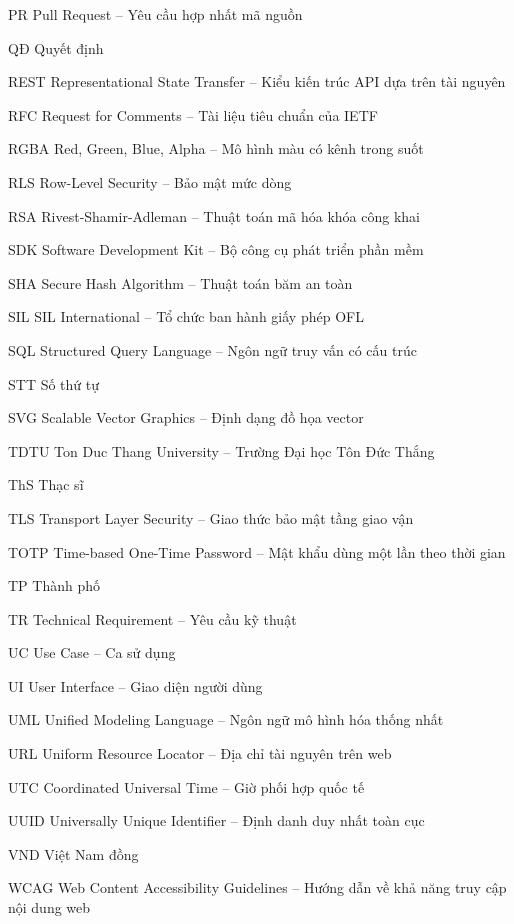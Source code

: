 \begin{abbrv}
	\item[PR] Pull Request -- Yêu cầu hợp nhất mã nguồn
	\item[QĐ] Quyết định
	\item[REST] Representational State Transfer -- Kiểu kiến trúc API dựa trên tài nguyên
	\item[RFC] Request for Comments -- Tài liệu tiêu chuẩn của IETF
	\item[RGBA] Red, Green, Blue, Alpha -- Mô hình màu có kênh trong suốt
	\item[RLS] Row-Level Security -- Bảo mật mức dòng
	\item[RSA] Rivest-Shamir-Adleman -- Thuật toán mã hóa khóa công khai
	\item[SDK] Software Development Kit -- Bộ công cụ phát triển phần mềm
	\item[SHA] Secure Hash Algorithm -- Thuật toán băm an toàn
	\item[SIL] SIL International -- Tổ chức ban hành giấy phép OFL
	\item[SQL] Structured Query Language -- Ngôn ngữ truy vấn có cấu trúc
	\item[STT] Số thứ tự
	\item[SVG] Scalable Vector Graphics -- Định dạng đồ họa vector
	\item[TDTU] Ton Duc Thang University -- Trường Đại học Tôn Đức Thắng
	\item[ThS] Thạc sĩ
	\item[TLS] Transport Layer Security -- Giao thức bảo mật tầng giao vận
	\item[TOTP] Time-based One-Time Password -- Mật khẩu dùng một lần theo thời gian
	\item[TP] Thành phố
	\item[TR] Technical Requirement -- Yêu cầu kỹ thuật
	\item[UC] Use Case -- Ca sử dụng
	\item[UI] User Interface -- Giao diện người dùng
	\item[UML] Unified Modeling Language -- Ngôn ngữ mô hình hóa thống nhất
	\item[URL] Uniform Resource Locator -- Địa chỉ tài nguyên trên web
	\item[UTC] Coordinated Universal Time -- Giờ phối hợp quốc tế
	\item[UUID] Universally Unique Identifier -- Định danh duy nhất toàn cục
	\item[VND] Việt Nam đồng
	\item[WCAG] Web Content Accessibility Guidelines -- Hướng dẫn về khả năng truy cập nội dung web
\end{abbrv}


